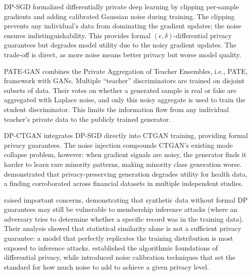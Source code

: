 DP-SGD \cite{abadi2016dpsgd} formalized differentially private deep learning by clipping per-sample gradients and adding calibrated Gaussian noise during training. The clipping prevents any individual's data from dominating the gradient updates; the noise ensures indistinguishability. This provides formal $(\epsilon, \delta)$-differential privacy guarantees but degrades model utility due to the noisy gradient updates. The trade-off is direct, as more noise means better privacy but worse model quality.

PATE-GAN \cite{jordon2019pategan} combines the Private Aggregation of Teacher Ensembles, i.e., PATE, framework with GANs. Multiple ``teacher'' discriminators are trained on disjoint subsets of data. Their votes on whether a generated sample is real or fake are aggregated with Laplace noise, and only this noisy aggregate is used to train the student discriminator. This limits the information flow from any individual teacher's private data to the publicly trained generator.

DP-CTGAN \cite{torkzadehmahani2019dpctgan} integrates DP-SGD directly into CTGAN training, providing formal privacy guarantees. The noise injection compounds CTGAN's existing mode collapse problem, however: when gradient signals are noisy, the generator finds it harder to learn rare minority patterns, making minority class generation worse. \cite{yale2020synthetic} demonstrated that privacy-preserving generation degrades utility for health data, a finding corroborated across financial datasets in multiple independent studies.

\cite{stadler2022synthetic} raised important concerns, demonstrating that synthetic data without formal DP guarantees may still be vulnerable to membership inference attacks (where an adversary tries to determine whether a specific record was in the training data). Their analysis showed that statistical similarity alone is not a sufficient privacy guarantee: a model that perfectly replicates the training distribution is most exposed to inference attacks. \cite{dwork2014algorithmic} established the algorithmic foundations of differential privacy, while \cite{dwork2006calibrating} introduced noise calibration techniques that set the standard for how much noise to add to achieve a given privacy level.

